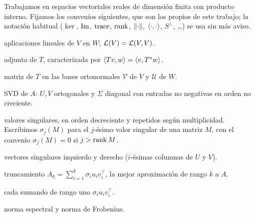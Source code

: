 
Trabajamos en espacios vectoriales reales de dimensión finita con producto
interno. Fijamos los convenios siguientes, que son los propios de este trabajo;
la notación habitual ($\ker$, $\operatorname{Im}$, $\operatorname{trace}$, $\operatorname{rank}$, $\lVert\cdot\rVert$,
$\langle\cdot,\cdot\rangle$, $S^{\perp}$, \ldots) se usa sin más aviso.

\begin{description}[leftmargin=6.5em,style=nextline,itemsep=2pt]
	\item[$\Lin{V,W}$] aplicaciones lineales de $V$ en $W$; $\mathcal{L}(V)=\mathcal{L}(V,V)$.
	\item[$\adj{T}$] adjunta de $T$, caracterizada por $\langle Tv,w\rangle=\langle v,T^{\ast}w\rangle$.
	\item[{$[T]_{\mathcal{V}}^{\mathcal{U}}$}] matriz de $T$ en las bases ortonormales $\mathcal{V}$ de $V$ y $\mathcal{U}$ de $W$.
	\item[$A=U\Sigma V^{\top}$] SVD de $A$: $U,V$ ortogonales y $\Sigma$ diagonal con entradas no negativas en orden no creciente.
	\item[$\sigma_1\geq\cdots\geq\sigma_n\geq0$] valores singulares, en orden decreciente y repetidos según multiplicidad. Escribimos $\sigma_j(M)$ para el $j$-ésimo valor singular de una matriz $M$, con el convenio $\sigma_j(M)=0$ si $j>\operatorname{rank} M$.
	\item[$u_i,\,v_i$] vectores singulares izquierdo y derecho ($i$-ésimas columnas de $U$ y $V$).
	\item[$A_k$] truncamiento $A_k=\sum_{i=1}^{k}\sigma_i u_i v_i^{\top}$, la mejor aproximación de rango $k$ a $A$.
	\item[modo] cada sumando de rango uno $\sigma_i u_i v_i^{\top}$.
	\item[$\norm{\cdot}_2,\ \norm{\cdot}_F$] norma espectral y norma de Frobenius.
\end{description}
